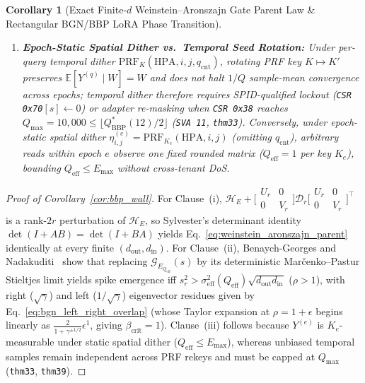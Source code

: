 \documentclass[11pt,letterpaper]{article}
\theoremstyle{spectralthm}
\newtheorem{corollary}[theorem]{Corollary}
\begin{document}
\begin{corollary}[Exact Finite-$d$ Weinstein--Aronszajn Gate Parent Law \& Rectangular BGN/BBP LoRA Phase Transition]
\begin{enumerate}
  \item[(iii)] \textbf{Epoch-Static Spatial Dither vs.\ Temporal Seed Rotation:} Under \emph{per-query temporal dither} $\mathrm{PRF}_K(\mathrm{HPA}, i, j, q_{\mathrm{cnt}})$, rotating PRF key $K \mapsto K'$ preserves $\mathbb{E}[Y^{(q)} \mid W] = W$ and \emph{does not} halt $1/Q$ sample-mean convergence across epochs; temporal dither therefore requires SPID-qualified lockout (\texttt{CSR 0x70}$[s] \leftarrow 0$) or adapter re-masking when \texttt{CSR 0x38} reaches $Q_{\max} = 10,000 \le \lfloor Q_{\mathrm{BBP}}^*(12)/2 \rfloor$ (\texttt{SVA 11}, \texttt{thm33}). Conversely, under \emph{epoch-static spatial dither} $\eta_{i,j}^{(e)} = \mathrm{PRF}_{K_e}(\mathrm{HPA}, i, j)$ (omitting $q_{\mathrm{cnt}}$), arbitrary reads within epoch $e$ observe one fixed rounded matrix ($Q_{\mathrm{eff}} = 1$ per key $K_e$), bounding $Q_{\mathrm{eff}} \le E_{\max}$ without cross-tenant DoS.
\end{enumerate}
\end{corollary}
\begin{proof}[Proof of Corollary~\ref{cor:bbp_wall}]
For Clause~(i), $\mathcal{H}_E + \bigl[\begin{smallmatrix}U_r & 0\\ 0 & V_r\end{smallmatrix}\bigr]\mathcal{D}_r\bigl[\begin{smallmatrix}U_r & 0\\ 0 & V_r\end{smallmatrix}\bigr]^\top$ is a rank-$2r$ perturbation of $\mathcal{H}_E$, so Sylvester's determinant identity $\det(I + AB) = \det(I + BA)$ yields Eq.~\eqref{eq:weinstein_aronszajn_parent} identically at every finite $(d_{\mathrm{out}}, d_{\mathrm{in}})$. For Clause~(ii), Benaych-Georges and Nadakuditi~\cite[Thm.~2.8]{benaych2012singular} show that replacing $\mathcal{G}_{E_{Q_{\mathrm{eff}}}}(s)$ by its deterministic Mar\v{c}enko--Pastur Stieltjes limit yields spike emergence iff $s_r^2 > \sigma_{\mathrm{eff}}^2(Q_{\mathrm{eff}})\sqrt{d_{\mathrm{out}} d_{\mathrm{in}}}$ ($\rho > 1$), with right ($\sqrt{\gamma}$) and left ($1/\sqrt{\gamma}$) eigenvector residues given by Eq.~\eqref{eq:bgn_left_right_overlap} (whose Taylor expansion at $\rho = 1 + \epsilon$ begins linearly as $\frac{2}{1+\gamma^{\pm 1/2}}\epsilon^1$, giving $\beta_{\mathrm{crit}} = 1$). Clause~(iii) follows because $Y^{(e)}$ is $K_e$-measurable under static spatial dither ($Q_{\mathrm{eff}} \le E_{\max}$), whereas unbiased temporal samples remain independent across PRF rekeys and must be capped at $Q_{\max}$ (\texttt{thm33}, \texttt{thm39}).
\end{proof}
\end{document}
